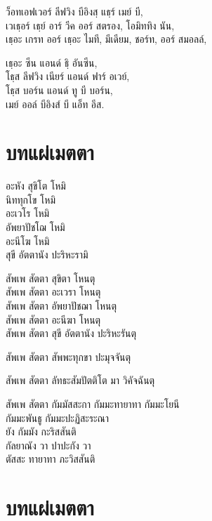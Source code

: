 ว็อทเอฟเวอร์ ลีฟวิง บีอิงสฺ แธฺร์ เมย์ บี,\\
เวเธฺอร์ เธฺย์ อาร์ วีค ออร์ สตรอง, โอมิททิง นัน,\\
เธฺอะ เกรท ออร์ เธฺอะ ไมที, มีเดียม, ชอร์ท, ออร์ สมอลล์,


เธฺอะ ซีน แอนด์ ธฺิ อันซีน,\\
โธฺส ลีฟวิง เนียร์ แอนด์ ฟาร์ อเวย์,\\
โธฺส บอร์น แอนด์ ทู บี บอร์น,\\
เมย์ ออล์ บีอิงส์ บี แอ็ท อีส.

\chapter[แผ่เมตตา]{บทแผ่เมตตา}


อะหัง สุขิโต โหมิ\\
นิททุกโข โหมิ\\
อะเวโร โหมิ\\
อัพยาปัชโฌ โหมิ\\
อะนีโฆ โหมิ\\
สุขี อัตตานัง ปะริหะรามิ

สัพเพ สัตตา สุขิตา โหนตุ\\
สัพเพ สัตตา อะเวรา โหนตุ\\
สัพเพ สัตตา อัพยาปัชฌา โหนตุ\\
สัพเพ สัตตา อะนีฆา โหนตุ\\
สัพเพ สัตตา สุขี อัตตานัง ปะริหะรันตุ

สัพเพ สัตตา สัพพะทุกขา ปะมุจจันตุ

สัพเพ สัตตา ลัทธะสัมปัตติโต มา วิคัจฉันตุ

สัพเพ สัตตา กัมมัสสะกา กัมมะทายาทา กัมมะโยนี\\
\vin กัมมะพันธู กัมมะปะฏิสะระณา\\
ยัง กัมมัง กะริสสันติ\\
กัลยาณัง วา ปาปะกัง วา\\
ตัสสะ ทายาทา ภะวิสสันติ

\chapter{บทแผ่เมตตา}


\begin{leader}
\end{leader}

